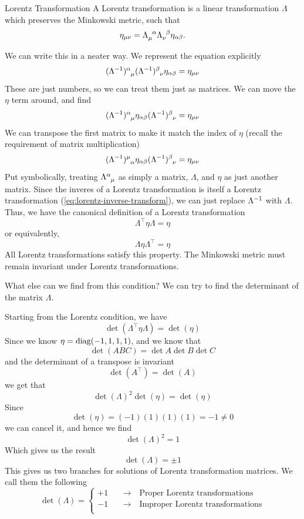 		\begin{definition}{Lorentz Transformation}
			A Lorentz transformation is a linear transformation
			$\Lambda$ which preserves the Minkowski metric, such that
			\begin{equation}
				\label{eq:lorentz-transformation}
				\eta_{\mu\nu}
				=
				\Lambda\indices{_\mu^\alpha}
				\Lambda\indices{_\nu^\beta}
				\eta_{\alpha\beta}.
			\end{equation}
		\end{definition}
		We can write this in a neater way. We represent the equation
		explicitly
		\[
			(\Lambda\inv)\indices{^\alpha_\mu}
			(\Lambda\inv)\indices{^\beta_\nu}
			\eta_{\alpha\beta}
			=
			\eta_{\mu\nu}
		\]
		These are just numbers, so we can treat them just as matrices.
		We can move the $\eta$ term around, and find
		\[
			(\Lambda\inv)\indices{^\alpha_\mu}
			\eta_{\alpha\beta}
			(\Lambda\inv)\indices{^\beta_\nu}
			=
			\eta_{\mu\nu}
		\]
		We can transpose the first matrix to make it match
		the index of $\eta$ (recall the requirement of matrix multiplication)
		\[
			(\Lambda\inv)\indices{^\mu_\alpha}
			\eta_{\alpha\beta}
			(\Lambda\inv)\indices{^\beta_\nu}
			=
			\eta_{\mu\nu}
		\]
		Put symbolically, treating $\Lambda\indices{^\alpha_\mu}$ as 
		simply a matrix, $\Lambda$, and $\eta$ as just another matrix.
		Since the inveres of a Lorentz transformation is itself a
		Lorentz transformation (\ref{eq:lorentz-inverse-transform}),
		we can just replace $\Lambda^{-1}$ with $\Lambda$.
		Thus, we have the canonical definition of a Lorentz transformation
		\begin{equation}
			\label{eq:lorentz-transformation-symbol}
		\Lambda^\top\eta\Lambda=\eta
		\end{equation}
		or equivalently,
		\[
			\Lambda\eta\Lambda^\top = \eta
		\]
		All Lorentz transformations satisfy this property. The Minkowski
		metric must remain invariant under Lorentz transformations.

		What else can we find from this condition?
		We can try to find the determinant of the matrix $\Lambda$.

		Starting from the Lorentz condition, we have
		\[
			\det(\Lambda^\top \eta \Lambda) = \det(\eta)
		\]
		Since we know $\eta = \operatorname{diag}(-1,1,1,1)$, and we know that
		\[
			\det(ABC) = \det A \det B \det C
		\]
		and the determinant of a transpose is invariant
		\[
			\det(A^\top) = \det(A)
		\]
		we get that
		\[
			\det(\Lambda)^2 \det(\eta) = \det(\eta)
		\]
		Since 
		\[
			\det(\eta) = (-1)(1)(1)(1) = -1\neq 0
		\]
		we can cancel it, and hence we find
		\[
			\det(\Lambda)^2 = 1
		\]
		Which gives us the result
		\begin{equation}
			\label{eq:det-lorentz}
			\det(\Lambda) = \pm 1
		\end{equation}
		This gives us two branches for solutions of Lorentz transformation
		matrices. We call them the following
		\[
			\det(\Lambda) = 
			\begin{cases}
				+1&\quad \to \quad \text{Proper Lorentz transformations}\\
				-1&\quad \to \quad \text{Improper Lorentz transformations}\\
			\end{cases}
		\]

